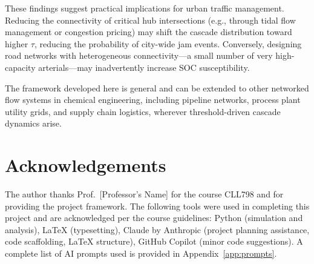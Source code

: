 \documentclass[12pt,a4paper]{article}
\begin{document}
These findings suggest practical implications for urban traffic 
management. Reducing the connectivity of critical hub intersections 
(e.g., through tidal flow management or congestion pricing) may 
shift the cascade distribution toward higher $\tau$, reducing the 
probability of city-wide jam events. Conversely, designing road 
networks with heterogeneous connectivity—a small number of very 
high-capacity arterials—may inadvertently increase SOC susceptibility.

The framework developed here is general and can be extended to other 
networked flow systems in chemical engineering, including pipeline 
networks, process plant utility grids, and supply chain logistics, 
wherever threshold-driven cascade dynamics arise.

\section*{Acknowledgements}

The author thanks Prof.\ [Professor's Name] for the course CLL798 
and for providing the project framework. The following tools were 
used in completing this project and are acknowledged per the course 
guidelines: Python (simulation and analysis), LaTeX (typesetting), 
Claude by Anthropic (project planning assistance, code scaffolding, 
LaTeX structure), GitHub Copilot (minor code suggestions). A complete 
list of AI prompts used is provided in Appendix~\ref{app:prompts}.



\end{document}
